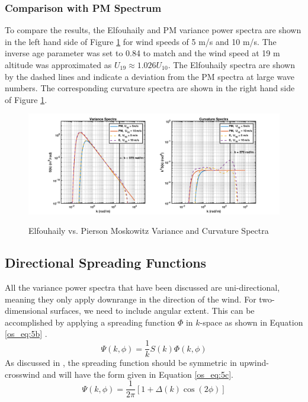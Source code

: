 \subsubsection{Comparison with PM Spectrum}
To compare the results, the Elfouhaily and PM variance power spectra are shown in the left hand side of Figure \ref{os_fig:2} for wind speeds of 5 m/s and 10 m/s. The inverse age parameter was set to 0.84 to match and the wind speed at 19 m altitude was approximated as $U_{19} \approx 1.026 U_{10}$. The Elfouhaily spectra are shown by the dashed lines and indicate a deviation from the PM spectra at large wave numbers. The corresponding curvature spectra are shown in the right hand side of Figure \ref{os_fig:2}. 
\begin{figure}[H]
  \begin{center}
\includegraphics[width=6in]{../media/Ocean_Surface/elf_vs_PM_variance_curvature_spectrum.png}
  \end{center}
  \renewcommand{\baselinestretch}{1} \small\normalsize
  \begin{quote}
    \caption[Elfouhaily vs. Pierson Moskowitz Variance and Curvature Spectra]{Elfouhaily vs. Pierson Moskowitz Variance and Curvature Spectra\label{os_fig:2}}
  \end{quote}
\end{figure}
\renewcommand{\baselinestretch}{2} \small\normalsize

\subsection{Directional Spreading Functions}
All the variance power spectra that have been discussed are uni-directional, meaning they only apply downrange in the direction of the wind. For two-dimensional surfaces, we need to include angular extent. This can be accomplished by applying a spreading function $\Phi$ in $k$-space as shown in Equation \ref{os_eq:5b} \cite{elfouhaily}.
\begin{equation}
\label{os_eq:5b}
\Psi(k,\phi) = \frac{1}{k}S(k)\Phi(k,\phi)
\end{equation}
\renewcommand{\baselinestretch}{2} \small\normalsize
As discussed in \cite{elfouhaily}, the spreading function should be symmetric in upwind-crosswind and will have the form given in Equation \ref{os_eq:5c}.
\begin{equation}
\label{os_eq:5c}
\Psi(k,\phi) = \frac{1}{2\pi}\left[1 + \Delta(k)\cos(2\phi) \right]
\end{equation}
\renewcommand{\baselinestretch}{2} \small\normalsize

